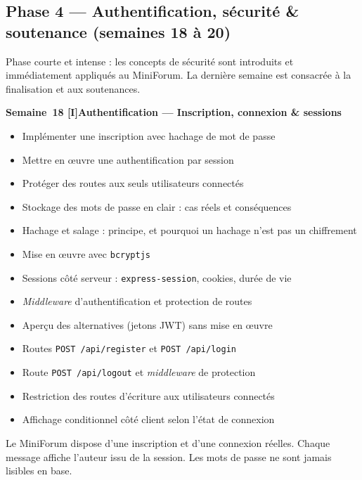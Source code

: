 \documentclass[a4paper,11pt]{article}
\newcommand{\semainetitre}[4]{%
  \needspace{9\baselineskip}%
  \vspace{8pt}
  \noindent
  \begin{tcolorbox}[
    enhanced, colback=cfptBlack, colframe=cfptBlack,
    boxrule=0pt, arc=3pt, boxsep=0pt,
    left=8pt, right=90pt, top=4pt, bottom=4pt,
    overlay={%
      \node[anchor=east, fill=cfptYellow, text=cfptBlack,
            rounded corners=2pt, inner xsep=6pt, inner ysep=3pt,
            font=\scriptsize\bfseries]
        at ([xshift=-6pt]frame.east) {#3};}
  ]
  \color{white}\bfseries\small Semaine~#1 \quad\textcolor{cfptYellow}{[#4]}\quad #2
  \end{tcolorbox}
  \vspace{-4pt}
}
\newcommand{\contenutitre}[1]{%
  \vspace{4pt}
  \noindent{\small\color{accentBlue}\textbf{#1}}\vspace{2pt}
}
\begin{document}
\newpage

\subsection{Phase 4 --- Authentification, sécurité \& soutenance (semaines 18 à 20)}

\begin{tcolorbox}[intro]
\small Phase courte et intense : les concepts de sécurité sont introduits et immédiatement appliqués au MiniForum. La dernière semaine est consacrée à la finalisation et aux soutenances.
\end{tcolorbox}

\semainetitre{18}{Authentification --- Inscription, connexion \& sessions}{3h cours / 4h TP}{I}
\begin{tcolorbox}[semaine]
\begin{tcolorbox}[objectifs]
\begin{itemize}
  \item Implémenter une inscription avec hachage de mot de passe
  \item Mettre en œuvre une authentification par session
  \item Protéger des routes aux seuls utilisateurs connectés
\end{itemize}
\end{tcolorbox}
\vspace{4pt}
\contenutitre{Cours}
\begin{itemize}
  \item Stockage des mots de passe en clair : cas réels et conséquences
  \item Hachage et salage : principe, et pourquoi un hachage n'est pas un chiffrement
  \item Mise en œuvre avec \texttt{bcryptjs}
  \item Sessions côté serveur : \texttt{express-session}, cookies, durée de vie
  \item \textit{Middleware} d'authentification et protection de routes
  \item Aperçu des alternatives (jetons JWT) sans mise en œuvre
\end{itemize}
\contenutitre{Travaux pratiques}
\begin{itemize}
  \item Routes \texttt{POST /api/register} et \texttt{POST /api/login}
  \item Route \texttt{POST /api/logout} et \textit{middleware} de protection
  \item Restriction des routes d'écriture aux utilisateurs connectés
  \item Affichage conditionnel côté client selon l'état de connexion
\end{itemize}
\end{tcolorbox}
\begin{tcolorbox}[filrouge={Seuls les membres peuvent poster}]
\small Le MiniForum dispose d'une inscription et d'une connexion réelles. Chaque message affiche l'auteur issu de la session. Les mots de passe ne sont jamais lisibles en base.
\end{tcolorbox}
\end{document}
